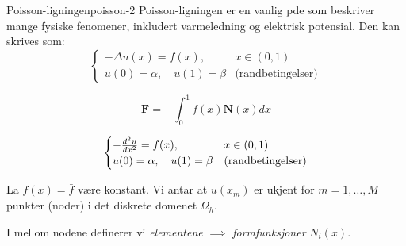 \begin{example}{Poisson-ligningen}{poisson-2}
    Poisson-ligningen er en vanlig pde som beskriver mange fysiske fenomener, inkludert varmeledning og elektrisk potensial.
    Den kan skrives som:
    \begin{equation}
        \begin{cases}
            -\Delta u(x) = f(x),              & x \in (0,1)              \\
            u(0) = \alpha, \quad u(1) = \beta & \text{(randbetingelser)}
        \end{cases}
    \end{equation}

    \begin{equation}
        \mathbf{F} = - \int_0^1 f( x) \mathbf{N}(x) dx
    \end{equation}

    \begin{equation}
        \begin{cases}
            -\ddn[u]{2}{x} = f(x),            & x \in (0,1)              \\
            u(0) = \alpha, \quad u(1) = \beta & \text{(randbetingelser)}
        \end{cases}
    \end{equation}

\end{example}

La \(f(x) = \bar{f}\) være konstant. Vi antar at \(u(x_m)\) er ukjent for \(m = 1, \ldots, M\) punkter (noder) i det diskrete domenet \(\Omega_h\).

I mellom nodene definerer vi \textit{elementene} \(\implies\) \textit{formfunksjoner} \(N_i(x)\).

